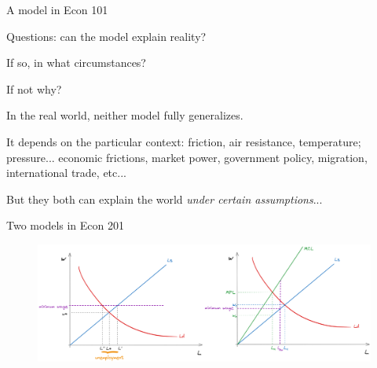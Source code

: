 \documentclass[notes,11pt, aspectratio=169, xcolor=table]{beamer}
\newenvironment{wideitemize}{\itemize\addtolength{\itemsep}{10pt}}{\enditemize}
\begin{document}
\begin{frame}{A model in Econ 101}
  \end{frame}


\begin{frame}{Questions: can the model explain reality?}
 \begin{wideitemize}
    \item If so, in what circumstances?
    \item If not why? 
    \item<2-> In the real world, neither model fully generalizes.
    \item<3-> It depends on the particular context: friction, air resistance, temperature; pressure... economic frictions, market power, government policy, migration, international trade, etc...
    \item<4-> But they both can   explain the world \textit{under certain assumptions}...
 \end{wideitemize}
\end{frame}

 \begin{frame}{Two models in Econ 201}
 \begin{figure}
    \centering
    \includegraphics[width=\textwidth]{figs/mw-competitive-monopsony.png}
\end{figure}
 \end{frame}
\end{document}

